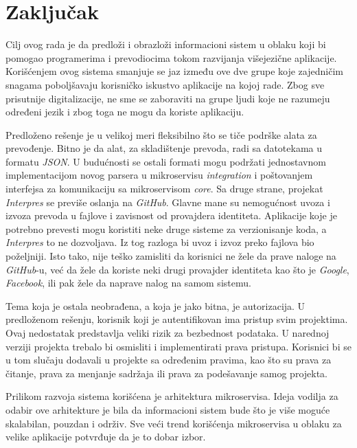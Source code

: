 \chapter{Zaključak}\label{ch:zakljucak}

Cilj ovog rada je da predloži i obrazloži informacioni sistem u oblaku koji bi pomogao 
programerima i prevodiocima tokom razvijanja višejezične aplikacije. Korišćenjem ovog 
sistema smanjuje se jaz između ove dve grupe koje zajedničim snagama poboljšavaju 
korisničko iskustvo aplikacije na kojoj rade. Zbog sve prisutnije digitalizacije, 
ne sme se zaboraviti na grupe ljudi koje ne razumeju određeni jezik i zbog toga 
ne mogu da koriste aplikaciju.

Predloženo rešenje je u velikoj meri fleksibilno što se tiče podrške alata za prevođenje.
Bitno je da alat, za skladištenje prevoda, radi sa datotekama u formatu \textit{JSON}. 
U budućnosti se ostali formati mogu podržati jednostavnom implementacijom novog parsera
u mikroservisu \textit{integration} i poštovanjem interfejsa za komunikaciju sa 
mikroservisom \textit{core}. Sa druge strane, projekat \textit{Interpres} se previše 
oslanja na \textit{GitHub}. Glavne mane su nemogućnost uvoza i izvoza prevoda u fajlove 
i zavisnost od provajdera identiteta. Aplikacije koje je potrebno prevesti mogu koristiti 
neke druge sisteme za verzionisanje koda, a \textit{Interpres} to ne dozvoljava. Iz tog 
razloga bi uvoz i izvoz preko fajlova bio poželjniji. Isto tako, 
nije teško zamisliti da korisnici ne žele da prave naloge na \textit{GitHub}-u, već da 
žele da koriste neki drugi provajder identiteta kao što je \textit{Google},
\textit{Facebook}, ili pak žele da naprave nalog na samom sistemu.

Tema koja je ostala neobrađena, a koja je jako bitna, je autorizacija. U predloženom rešenju,
korisnik koji je autentifikovan ima pristup svim projektima. Ovaj nedostatak predstavlja 
veliki rizik za bezbednost podataka. U narednoj verziji projekta trebalo bi osmisliti i 
implementirati prava pristupa. Korisnici bi se u tom slučaju dodavali u projekte sa određenim 
pravima, kao što su prava za čitanje, prava za menjanje sadržaja ili prava za podešavanje 
samog projekta.

Prilikom razvoja sistema korišćena je arhitektura mikroservisa. Ideja vodilja za odabir 
ove arhitekture je bila da informacioni sistem bude što je više moguće skalabilan, 
pouzdan i održiv. Sve veći trend korišćenja mikroservisa u oblaku za velike aplikacije 
potvrđuje da je to dobar izbor. 

